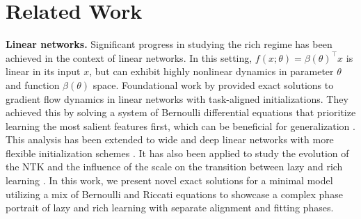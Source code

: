 \documentclass{article}
\theoremstyle{plain}
\theoremstyle{definition}
\theoremstyle{remark}
\begin{document}
\vspace{-5pt}
\section{Related Work}
\label{sec:related-work}
\vspace{-5pt}

%


\textbf{Linear networks.}
%
Significant progress in studying the rich regime has been achieved in the context of linear networks. 
%
In this setting, $f(x;\theta) = \beta(\theta)^\intercal x$ is linear in its input $x$, but can exhibit highly nonlinear dynamics in parameter $\theta$ and function $\beta(\theta)$ space.
%
Foundational work by \citet{saxe2013exact} provided exact solutions to gradient flow dynamics in linear networks with task-aligned initializations. 
%
They achieved this by solving a system of Bernoulli differential equations that prioritize learning the most salient features first, which can be beneficial for generalization \cite{lampinen2018analytic}.
%
This analysis has been extended to wide \cite{fukumizu1998effect, braun2022exact} and deep \cite{arora2018optimization, arora2019implicit, ziyin2022exact} linear networks with more flexible initialization schemes \cite{gidel2019implicit, tarmoun2021understanding, gissin2019implicit}.
%
It has also been applied to study the evolution of the NTK \cite{atanasov2021neural} and the influence of the scale on the transition between lazy and rich learning \cite{jacot2021saddle, xu2024does}.
%
In this work, we present novel exact solutions for a minimal model utilizing a mix of Bernoulli and Riccati equations to showcase a complex phase portrait of lazy and rich learning with separate alignment and fitting phases.
\end{document}
